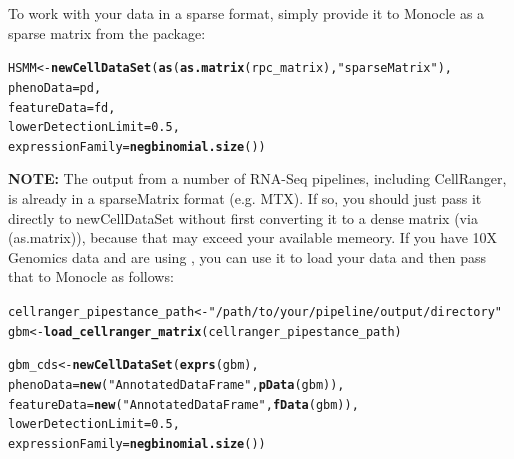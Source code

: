 \documentclass[10pt,oneside]{article}\usepackage[]{graphicx}\usepackage[]{color}
\makeatletter
\newcommand{\hlnum}[1]{\textcolor[rgb]{0.686,0.059,0.569}{#1}}%
\newcommand{\hlstr}[1]{\textcolor[rgb]{0.192,0.494,0.8}{#1}}%
\newcommand{\hlstd}[1]{\textcolor[rgb]{0.345,0.345,0.345}{#1}}%
\newcommand{\hlkwb}[1]{\textcolor[rgb]{0.69,0.353,0.396}{#1}}%
\newcommand{\hlkwc}[1]{\textcolor[rgb]{0.333,0.667,0.333}{#1}}%
\newcommand{\hlkwd}[1]{\textcolor[rgb]{0.737,0.353,0.396}{\textbf{#1}}}%
\newenvironment{kframe}{%
 \def\at@end@of@kframe{}%
 \ifinner\ifhmode%
  \def\at@end@of@kframe{\end{minipage}}%
  \begin{minipage}{\columnwidth}%
 \fi\fi%
 \def\FrameCommand##1{\hskip\@totalleftmargin \hskip-\fboxsep
 \colorbox{shadecolor}{##1}\hskip-\fboxsep
     \hskip-\linewidth \hskip-\@totalleftmargin \hskip\columnwidth}%
 \MakeFramed {\advance\hsize-\width
   \@totalleftmargin\z@ \linewidth\hsize
   \@setminipage}}%
 {\par\unskip\endMakeFramed%
 \at@end@of@kframe}
\newenvironment{knitrout}{}{} %
\makeatother
\begin{document}
To work with your data in a sparse format, simply provide it to Monocle as a sparse matrix from the  package:
 
\begin{knitrout}
\color{fgcolor}\begin{kframe}
\begin{alltt}
\hlstd{HSMM} \hlkwb{<-} \hlkwd{newCellDataSet}\hlstd{(}\hlkwd{as}\hlstd{(}\hlkwd{as.matrix}\hlstd{(rpc_matrix),} \hlstr{"sparseMatrix"}\hlstd{),}
                       \hlkwc{phenoData} \hlstd{= pd,}
                       \hlkwc{featureData} \hlstd{= fd,}
                       \hlkwc{lowerDetectionLimit}\hlstd{=}\hlnum{0.5}\hlstd{,}
                       \hlkwc{expressionFamily}\hlstd{=}\hlkwd{negbinomial.size}\hlstd{())}
\end{alltt}
\end{kframe}
\end{knitrout}
 
\textbf{NOTE:} The output from a number of RNA-Seq pipelines, including CellRanger, is already in a sparseMatrix format (e.g. MTX). If so, you should just pass it directly to newCellDataSet without first converting it to a dense matrix (via \Rfunction(as.matrix)), because that may exceed your available memeory. If you have 10X Genomics data and are using , you can use it to load your data and then pass that to Monocle as follows:

\begin{knitrout}
\color{fgcolor}\begin{kframe}
\begin{alltt}
\hlstd{cellranger_pipestance_path} \hlkwb{<-} \hlstr{"/path/to/your/pipeline/output/directory"}
\hlstd{gbm} \hlkwb{<-} \hlkwd{load_cellranger_matrix}\hlstd{(cellranger_pipestance_path)}

\hlstd{gbm_cds} \hlkwb{<-} \hlkwd{newCellDataSet}\hlstd{(}\hlkwd{exprs}\hlstd{(gbm),}
                         \hlkwc{phenoData} \hlstd{=} \hlkwd{new}\hlstd{(}\hlstr{"AnnotatedDataFrame"}\hlstd{,} \hlkwd{pData}\hlstd{(gbm)),}
                         \hlkwc{featureData} \hlstd{=} \hlkwd{new}\hlstd{(}\hlstr{"AnnotatedDataFrame"}\hlstd{,} \hlkwd{fData}\hlstd{(gbm)),}
                         \hlkwc{lowerDetectionLimit}\hlstd{=}\hlnum{0.5}\hlstd{,}
                         \hlkwc{expressionFamily}\hlstd{=}\hlkwd{negbinomial.size}\hlstd{())}
\end{alltt}
\end{kframe}
\end{knitrout}
 
\end{document}
